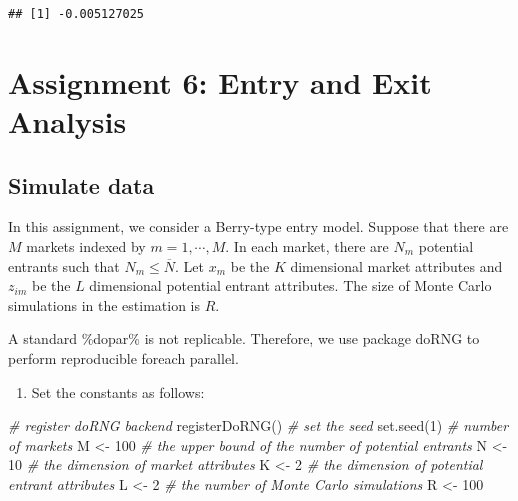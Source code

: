 \documentclass[
]{book}
\newenvironment{Shaded}{\begin{snugshade}}{\end{snugshade}}
\newcommand{\CommentTok}[1]{\textcolor[rgb]{0.56,0.35,0.01}{\textit{#1}}}
\newcommand{\DecValTok}[1]{\textcolor[rgb]{0.00,0.00,0.81}{#1}}
\newcommand{\FunctionTok}[1]{\textcolor[rgb]{0.00,0.00,0.00}{#1}}
\newcommand{\NormalTok}[1]{#1}
\newcommand{\OtherTok}[1]{\textcolor[rgb]{0.56,0.35,0.01}{#1}}
\providecommand{\tightlist}{%
  \setlength{\itemsep}{0pt}\setlength{\parskip}{0pt}}
\begin{document}
\begin{verbatim}
## [1] -0.005127025
\end{verbatim}

\hypertarget{assignment6}{%
\chapter{Assignment 6: Entry and Exit Analysis}\label{assignment6}}

\hypertarget{simulate-data-5}{%
\section{Simulate data}\label{simulate-data-5}}

In this assignment, we consider a Berry-type entry model. Suppose that there are \(M\) markets indexed by \(m = 1, \cdots, M\). In each market, there are \(N_m\) potential entrants such that \(N_m \le \overline{N}\). Let \(x_m\) be the \(K\) dimensional market attributes and \(z_{im}\) be the \(L\) dimensional potential entrant attributes. The size of Monte Carlo simulations in the estimation is \(R\).

A standard \%dopar\% is not replicable. Therefore, we use package doRNG to perform reproducible foreach parallel.

\begin{enumerate}
\def\labelenumi{\arabic{enumi}.}
\tightlist
\item
  Set the constants as follows:
\end{enumerate}

\begin{Shaded}
\begin{Highlighting}[]
\CommentTok{\# register doRNG backend}
\FunctionTok{registerDoRNG}\NormalTok{()}
\CommentTok{\# set the seed}
\FunctionTok{set.seed}\NormalTok{(}\DecValTok{1}\NormalTok{)}
\CommentTok{\# number of markets}
\NormalTok{M }\OtherTok{\textless{}{-}} \DecValTok{100}
\CommentTok{\# the upper bound of the number of potential entrants}
\NormalTok{N }\OtherTok{\textless{}{-}} \DecValTok{10}
\CommentTok{\# the dimension of market attributes}
\NormalTok{K }\OtherTok{\textless{}{-}} \DecValTok{2}
\CommentTok{\# the dimension of potential entrant attributes}
\NormalTok{L }\OtherTok{\textless{}{-}} \DecValTok{2}
\CommentTok{\# the number of Monte Carlo simulations}
\NormalTok{R }\OtherTok{\textless{}{-}} \DecValTok{100}
\end{Highlighting}
\end{Shaded}
\end{document}
